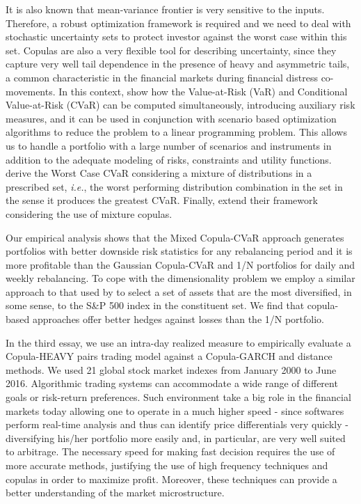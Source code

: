 \documentclass[a4paper,12pt]{report}
\begin{document}
	It is also known that mean-variance frontier is very sensitive to the inputs. Therefore, a robust optimization framework is required and we need to deal with stochastic uncertainty sets to protect investor against the worst case within this set. Copulas are also a very flexible tool for describing uncertainty, since they capture very well tail dependence in the presence of heavy and asymmetric tails, a common characteristic in the financial markets during financial distress co-movements. In this context, \citet*{rockafellar2000} show how the Value-at-Risk (VaR) and Conditional Value-at-Risk (CVaR) can be computed simultaneously, introducing auxiliary risk measures, and it can be used in conjunction with scenario based optimization algorithms to reduce the problem to a linear programming problem. This allows us to handle a portfolio with a large number of scenarios and instruments in addition to the adequate modeling of risks, constraints and utility functions. \citet*{zhu2009worst} derive the Worst Case CVaR considering a mixture of distributions in a prescribed set, \emph{i.e.}, the worst performing distribution combination in the set in the sense it produces the greatest CVaR. Finally, \citet*{kakouris14} extend their framework considering the use of mixture copulas.
	
	Our empirical analysis shows that the Mixed Copula-CVaR
	approach generates portfolios with better downside risk statistics for any rebalancing period and it is more profitable than the Gaussian Copula-CVaR and 1/N portfolios for daily and weekly rebalancing. To cope with the dimensionality problem we employ a similar approach to that used by \citet*{ggr06} to select a set of assets that are the most
	diversified, in some sense, to the S\&P 500 index in the constituent set. We find that copula-based approaches offer better hedges against losses than the 1/N portfolio. 
	
	
	In the third essay, we use an intra-day realized measure to empirically evaluate a Copula-HEAVY pairs trading model against a Copula-GARCH and distance methods. We used 21 global stock market indexes from January 2000 to June 2016. Algorithmic trading systems can accommodate a wide range of different goals or risk-return preferences. Such environment take a big role in the financial markets today allowing one to operate in a much higher speed - since softwares perform real-time analysis and thus can identify price differentials very quickly - diversifying his/her portfolio more easily and, in particular, are very well suited to arbitrage. The necessary speed for making fast decision requires the use of more accurate methods, justifying the use of high frequency techniques and copulas in order to maximize profit. Moreover, these techniques can provide a better understanding of the market microstructure.
	
\end{document}

